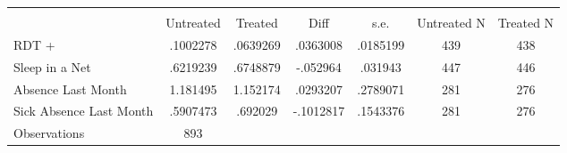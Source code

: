 {
\def\sym#1{\ifmmode^{#1}\else\(^{#1}\)\fi}
\begin{tabular}{l*{1}{cccccc}}
\hline\hline
                    &\multicolumn{6}{c}{}                                                         \\
                    &   Untreated&     Treated&        Diff&        s.e.& Untreated N&   Treated N\\
\hline
RDT +               &    .1002278&    .0639269&    .0363008&    .0185199&         439&         438\\
Sleep in a Net      &    .6219239&    .6748879&    -.052964&     .031943&         447&         446\\
Absence  Last Month &    1.181495&    1.152174&    .0293207&    .2789071&         281&         276\\
Sick Absence Last Month&    .5907473&     .692029&   -.1012817&    .1543376&         281&         276\\
\hline
Observations        &         893&            &            &            &            &            \\
\hline\hline
\end{tabular}
}
